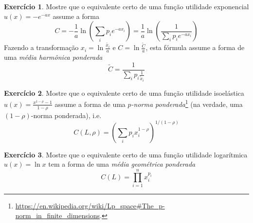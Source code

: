 \documentclass[12pt]{article}
\numberwithin{equation}{section}
\theoremstyle{plain}
\theoremstyle{definition}
\newtheorem{exercise}{Exercício}
\theoremstyle{remark}
\begin{document}
\begin{exercise}
Mostre que o equivalente certo de uma função utilidade exponencial
\(u(x) = - e^{-ax}\) assume a forma
\[
C = - \frac{1}{a} \ln\left( \sum \limits_{i}p_{i}e^{-ax_{i}} \right) = \frac{1}{a} \ln\left( \frac{1}{\sum \limits_{i}p_{i}e^{-ax_{i}}} \right)
\]
Fazendo a transformação \(x_i = \ln \frac{\tilde{x_{i}}}{a}\) e
\(C = \ln \frac{\tilde{C}}{a}\), esta fórmula assume a forma de uma
\textit{média harmônica ponderada}
\[
\tilde{C} = \frac{1}{\sum \limits_{i} p_{i} \frac{1}{\tilde{x}_{i}}} 
\]


\end{exercise}

\begin{exercise}
Mostre que o equivalente certo de uma função utilidade isoelástica
\(u(x) = \frac{x^{1-\rho}-1}{1-\rho}\) assume a forma de uma
\textit{$p$-norma ponderada}\footnote{\url{https://en.wikipedia.org/wiki/Lp_space\#The_p-norm_in_finite_dimensions}.} (na verdade, uma \((1-\rho)\)-norma ponderada), i.e.
\[
   C(L, \rho) = \left( \sum \limits_{i} p_{i} x_{i}^{1-\rho} \right)^{1/(1-\rho)}
   \]

\end{exercise}

\begin{exercise}
Mostre que o equivalente certo de uma função utilidade logarítmica
\(u(x) = \ln x\) tem a forma de uma \textit{média geométrica ponderada}
\[
C(L) = \prod \limits_{i=1}^{n} x_{i}^{p_{i}}
\]

\end{exercise}
\end{document}

